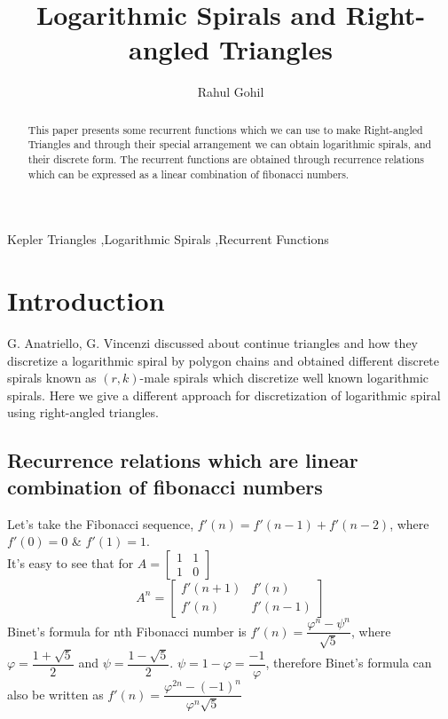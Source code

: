 \documentclass[preprint,12pt]{elsarticle}
\begin{document}
\begin{frontmatter}

\title{Logarithmic Spirals and Right-angled Triangles}

\author{Rahul Gohil}

\address{Student, B.E(Computer Engineering), Thadomal Shahani Engineering College, Mumbai, India}
\begin{abstract}
This paper presents some recurrent functions which we can use to make Right-angled Triangles and through their special arrangement we can obtain logarithmic spirals, and their discrete form. The recurrent functions are obtained through recurrence relations which can be expressed as a linear combination of fibonacci numbers.  
\end{abstract}

\begin{keyword}
Kepler Triangles \sep Logarithmic Spirals \sep Recurrent Functions
\end{keyword}

\end{frontmatter}

\section{Introduction}
G. Anatriello, G. Vincenzi\cite{paper1} discussed about continue triangles and how they discretize a logarithmic spiral by polygon chains and obtained different discrete spirals known as $(r, k)$-male spirals which discretize well known logarithmic spirals. Here we give a different approach for discretization of logarithmic spiral using right-angled triangles.
\subsection{Recurrence relations which are linear combination of fibonacci numbers}
\label{recurr}
Let's take the Fibonacci sequence, $f'(n) = f'(n - 1) + f'(n - 2)$, where $f'(0) = 0$ \& $f'(1) = 1$.\\
It's easy to see that for $A  = \begin{bmatrix}1 & 1 \\ 1 & 0 \end{bmatrix}$ $$A^n = \begin{bmatrix}f'(n + 1) & f'(n) \\ f'(n) & f'(n - 1)\end{bmatrix}$$
Binet's formula for nth Fibonacci number is $f'(n) = \dfrac{\varphi^n - \psi^n}{\sqrt{5}}$, where $\varphi = \dfrac{1 + \sqrt{5}}{2}$ and $\psi = \dfrac{1 - \sqrt{5}}{2}$\cite{Fn-wiki}.
$\psi = 1 - \varphi = \dfrac{-1}{\varphi}$, therefore Binet's formula can also be written as 
$f'(n) = \dfrac{\varphi^{2n} - (-1)^n}{\varphi^n\sqrt{5}}$\\
\end{document}
